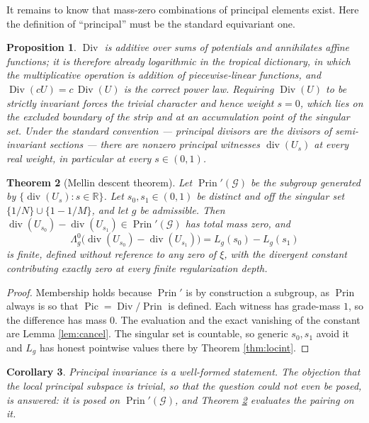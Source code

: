 \documentclass[11pt]{amsart}
\newtheorem{theorem}{Theorem}[section]
\newtheorem{proposition}[theorem]{Proposition}
\newtheorem{corollary}[theorem]{Corollary}
\theoremstyle{definition}
\theoremstyle{remark}
\newcommand{\R}{\mathbb R}
\newcommand{\Div}{\operatorname{Div}}
\newcommand{\divv}{\operatorname{div}}
\newcommand{\Prin}{\operatorname{Prin}}
\newcommand{\Gr}{\mathcal G}
\begin{document}
It remains to know that mass-zero combinations of principal elements exist.
Here the definition of ``principal'' must be the standard equivariant one.

\begin{proposition}\label{prop:semiinv}
$\Div$ is additive over sums of potentials and annihilates affine functions;
it is therefore already logarithmic in the tropical dictionary, in which the
multiplicative operation is addition of piecewise-linear functions, and
$\Div(cU)=c\,\Div(U)$ is the correct power law.  Requiring $\Div(U)$ to be
strictly invariant forces the trivial character and hence weight $s=0$, which
lies on the excluded boundary of the strip and at an accumulation point of
the singular set.  Under the standard convention --- principal divisors are
the divisors of semi-invariant sections --- there are nonzero principal
witnesses $\divv(U_s)$ at every real weight, in particular at every
$s\in(0,1)$.
\end{proposition}

\begin{theorem}[Mellin descent theorem]\label{thm:mellindescent}
Let $\Prin'(\Gr)$ be the subgroup generated by $\{\divv(U_s):s\in\R\}$.  Let
$s_0,s_1\in(0,1)$ be distinct and off the singular set
$\{1/N\}\cup\{1-1/M\}$, and let $g$ be admissible.  Then
$\divv(U_{s_0})-\divv(U_{s_1})\in\Prin'(\Gr)$ has total mass zero, and
\[
 \boxed{\;
 \Lambda_g^{0}\big(\divv(U_{s_0})-\divv(U_{s_1})\big)=L_g(s_0)-L_g(s_1)\;}
\]
is finite, defined without reference to any zero of $\xi$, with the divergent
constant contributing exactly zero at every finite regularization depth.
\end{theorem}

\begin{proof}
Membership holds because $\Prin'$ is by construction a subgroup, as
$\Prin$ always is so that $\operatorname{Pic}=\Div/\Prin$ is defined.  Each
witness has grade-mass $1$, so the difference has mass $0$.  The evaluation
and the exact vanishing of the constant are Lemma \ref{lem:cancel}.  The
singular set is countable, so generic $s_0,s_1$ avoid it and $L_g$ has honest
pointwise values there by Theorem \ref{thm:locint}.
\end{proof}

\begin{corollary}
Principal invariance is a well-formed statement.  The objection that the
local principal subspace is trivial, so that the question could not even be
posed, is answered: it is posed on $\Prin'(\Gr)$, and Theorem
\ref{thm:mellindescent} evaluates the pairing on it.
\end{corollary}
\end{document}
